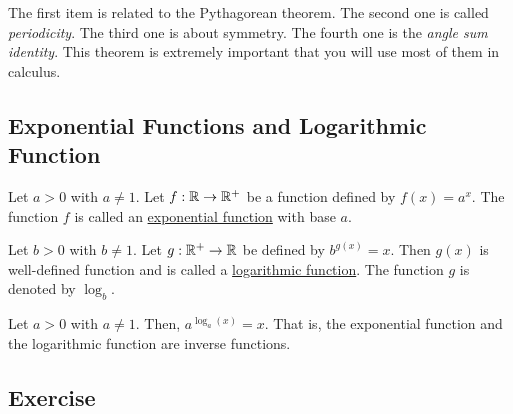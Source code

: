 \documentclass[11pt]{book}
\begin{document}
The first item is related to the Pythagorean theorem. The second one is called \emph{periodicity}. The third one is about symmetry. The fourth one is the \emph{angle sum identity}. This theorem is extremely important that you will use most of them in calculus.

\subsection*{Exponential Functions and Logarithmic Function}

\begin{definition}
    Let $a>0$ with $a\ne1$. Let $f:\mathbb{R}\to\mathbb{R}^+$ be a function defined by $f(x)=a^x$. The function $f$ is called an \underline{exponential function} with base $a$.
\end{definition}

\begin{definition}
    Let $b>0$ with $b\ne 1$. Let $g:\mathbb{R}^+\to\mathbb{R}$ be defined by $b^{g(x)}=x$. Then $g(x)$ is well-defined function and is called a \underline{logarithmic function}. The function $g$ is denoted by $\log_b$.
\end{definition}

\begin{theorem}
    Let $a>0$ with $a\ne 1$. Then, $a^{\log_a(x)}=x$. That is, the exponential function and the logarithmic function are inverse functions.
\end{theorem}

\subsection*{Exercise}
\end{document}
